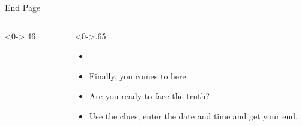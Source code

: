 \documentclass[notheorems]{beamer}
\begin{document}
\begin{framenl}{End Page}
\begin{columns}[T] %
\begin{column}<0->{.46\textwidth}
\begin{figure}[thpb]
\centering
{}

\end{figure}
\end{column}%
\hfill%
\begin{column}<0->{.65\textwidth}
\begin{itemize}
\item []

\item<1-> Finally, you comes to here.
\item<2-> Are you ready to face the truth?
\item<3-> Use the clues, enter the date and time and get your end.
\end{itemize}
\end{column}%
\end{columns}
\end{framenl}







\thankframe
\end{document}
